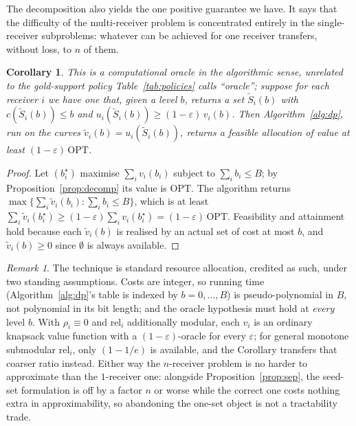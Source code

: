 \documentclass[sigconf,anonymous]{aamas}
\newtheorem{corollary}[proposition]{Corollary}
\theoremstyle{remark}
\newtheorem{remark}{Remark}
\begin{document}
The decomposition also yields the one positive guarantee we have. It
says that the difficulty of the multi-receiver problem is concentrated
entirely in the single-receiver subproblems: whatever can be achieved
for one receiver transfers, without loss, to $n$ of them.

\begin{corollary}
\label{prop:approx}
This is a computational oracle in the algorithmic sense, unrelated to
the gold-support policy Table~\ref{tab:policies} calls ``oracle'';
suppose for each receiver $i$ we have one that, given a level
$b$, returns a set $\widetilde{S}_i(b)$ with
$c(\widetilde{S}_i(b)) \le b$ and
$u_i(\widetilde{S}_i(b)) \ge (1-\varepsilon)\,v_i(b)$. Then
Algorithm~\ref{alg:dp}, run on the curves
$\widetilde{v}_i(b) = u_i(\widetilde{S}_i(b))$, returns a feasible
allocation of value at least $(1-\varepsilon)\,\mathrm{OPT}$.
\end{corollary}

\begin{proof}
Let $(b_i^{\star})$ maximise $\sum_i v_i(b_i)$ subject to
$\sum_i b_i \le B$; by Proposition~\ref{prop:decomp} its value is
$\mathrm{OPT}$. The algorithm returns
$\max \{\sum_i \widetilde{v}_i(b_i) : \sum_i b_i \le B\}$, which is at
least $\sum_i \widetilde{v}_i(b_i^{\star}) \ge (1-\varepsilon)\sum_i
v_i(b_i^{\star}) = (1-\varepsilon)\,\mathrm{OPT}$. Feasibility and
attainment hold because each $\widetilde{v}_i(b)$ is realised by an
actual set of cost at most $b$, and $\widetilde{v}_i(b) \ge 0$ since
$\emptyset$ is always available.
\end{proof}

\begin{remark}
The technique is standard resource allocation, credited as such, under
two standing assumptions. Costs are integer, so running time
(Algorithm~\ref{alg:dp}'s table is indexed by $b=0,\dots,B$) is
pseudo-polynomial in $B$, not polynomial in its bit length; and the
oracle hypothesis must hold at \emph{every} level $b$. With
$\rho_i\equiv0$ and $\mathrm{rel}_i$ additionally modular, each $v_i$
is an ordinary knapsack value function with a
$(1-\varepsilon)$-oracle for every $\varepsilon$; for general monotone
submodular $\mathrm{rel}_i$, only $(1-1/e)$ is available, and the
Corollary transfers that coarser ratio instead. Either way the
$n$-receiver problem is no harder to approximate than the
$1$-receiver one: alongside Proposition~\ref{prop:sep}, the seed-set
formulation is off by a factor $n$ or worse while the correct one
costs nothing extra in approximability, so abandoning the one-set
object is not a tractability trade.
\end{remark}
\end{document}
